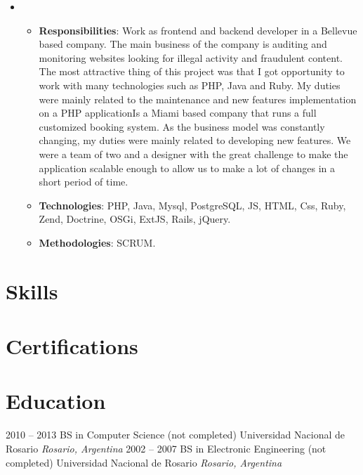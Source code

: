 \documentclass[11pt,a4paper,sans]{moderncv}        %
\begin{document}
  {
    \begin{itemize}
      \item
        \begin{itemize}
          \item \textbf{Responsibilities}: Work as frontend and backend developer in a Bellevue based company. The main business of the company is auditing and monitoring websites looking for illegal activity and fraudulent
content. The most attractive thing of this project was that I got opportunity to work with many technologies such as PHP, Java and Ruby. My duties were mainly related to the maintenance and new features implementation on a PHP
applicationIs a Miami based company that runs a full customized booking system. As the business model was constantly changing, my duties were mainly related to developing new features. We were a team of two and a designer with the great challenge to make the application scalable enough to allow us to make a lot of changes in a short period of time.
          \item \textbf{Technologies}:  PHP, Java, Mysql, PostgreSQL, JS, HTML, Css, Ruby,  Zend, Doctrine, OSGi, ExtJS, Rails, jQuery.
          \item \textbf{Methodologies}: SCRUM.
        \end{itemize}
    \end{itemize}
  }


\section{Skills}

\section{Certifications}

\section{Education}
\cventry
{2010 – 2013}
{BS in Computer Science (not completed)}
{Universidad Nacional de Rosario}
{}
{\textit{Rosario, Argentina}}
{}
\cventry
{2002 – 2007}
{BS in Electronic Engineering (not completed)}
{Universidad Nacional de Rosario} 
{}
{\textit{Rosario, Argentina}}
{}
\vspace{1mm}
\end{document}
